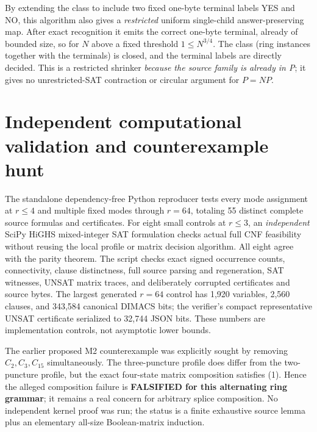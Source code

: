 \documentclass[11pt]{article}
\begin{document}
By extending the class to include two fixed one-byte terminal labels YES and NO, this algorithm also gives a \emph{restricted} uniform single-child answer-preserving map. After exact recognition it emits the correct one-byte terminal, already of bounded size, so for $N$ above a fixed threshold $1\le N^{3/4}$. The class (ring instances together with the terminals) is closed, and the terminal labels are directly decided. This is a restricted shrinker \emph{because the source family is already in P}; it gives no unrestricted-SAT contraction or circular argument for $P=NP$.

\section{Independent computational validation and counterexample hunt}
The standalone dependency-free Python reproducer tests every mode assignment at $r\le4$ and multiple fixed modes through $r=64$, totaling 55 distinct complete source formulas and certificates. For eight small controls at $r\le3$, an \emph{independent} SciPy HiGHS mixed-integer SAT formulation checks actual full CNF feasibility without reusing the local profile or matrix decision algorithm. All eight agree with the parity theorem. The script checks exact signed occurrence counts, connectivity, clause distinctness, full source parsing and regeneration, SAT witnesses, UNSAT matrix traces, and deliberately corrupted certificates and source bytes. The largest generated $r=64$ control has 1,920 variables, 2,560 clauses, and 343,584 canonical DIMACS bits; the verifier's compact representative UNSAT certificate serialized to 32,744 JSON bits. These numbers are implementation controls, not asymptotic lower bounds.

The earlier proposed M2 counterexample was explicitly sought by removing $C_2,C_3,C_{15}$ simultaneously. The three-puncture profile does differ from the two-puncture profile, but the exact four-state matrix composition satisfies (1). Hence the alleged composition failure is \textbf{FALSIFIED for this alternating ring grammar}; it remains a real concern for arbitrary splice composition. No independent kernel proof was run; the status is a finite exhaustive source lemma plus an elementary all-size Boolean-matrix induction.
\end{document}
